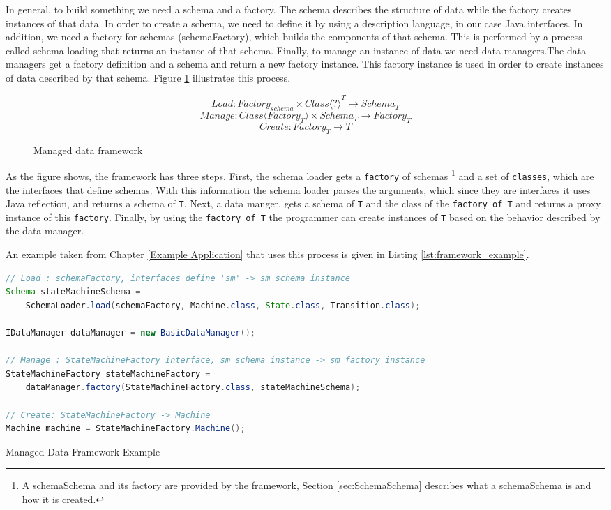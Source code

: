 In general, to build something we need a schema and a factory.
The schema describes the structure of data while the factory creates instances of that data.
In order to create a schema, we need to define it by using a description language, in our case Java interfaces.
In addition, we need a factory for schemas (schemaFactory), which builds the components of that schema.
This is performed by a process called schema loading that returns an instance of that schema.
Finally, to manage an instance of data we need data managers.The data managers get a factory definition and a schema and return a new factory instance.
This factory instance is used in order to create instances of data described by that schema.
Figure \ref{fig:formal_metamodel} illustrates this process.

\begin{figure}[H]
\centering
\[Load   : Factory_{schema} \times \overline{Class\langle ? \rangle}^{T} \rightarrow Schema_{T} \nonumber \]
\[Manage : Class\langle Factory_{T}\rangle \times Schema_{T} \rightarrow Factory_{T} \nonumber \]
\[Create : Factory_{T} \rightarrow T \nonumber\]

\caption{Managed data framework}
\label{fig:formal_metamodel}
\end{figure}

As the figure shows, the framework has three steps.
First, the schema loader gets a \texttt{factory} of schemas
\footnote{
	A schemaSchema and its factory are provided by the framework, Section \ref{sec:SchemaSchema} describes what a schemaSchema is and how it is created.} 
and a set of \texttt{classes}, which are the interfaces that define schemas.
With this information the schema loader parses the arguments, which since they are interfaces it uses Java reflection, and returns a schema of \texttt{T}.
Next, a data manger, gets a schema of \texttt{T} and the class of the \texttt{factory of T} and returns a proxy instance of this \texttt{factory}.
Finally, by using the \texttt{factory of T} the programmer can create instances of \texttt{T} based on the behavior described by the data manager.

An example taken from Chapter \ref{Example Application} that uses this process is given in Listing \ref{lst:framework_example}.

\begin{sourcecode}
	\begin{lstlisting}[language=Java, escapechar=|]
// Load : schemaFactory, interfaces define 'sm' -> sm schema instance
Schema stateMachineSchema =
	SchemaLoader.load(schemaFactory, Machine.class, State.class, Transition.class);

IDataManager dataManager = new BasicDataManager();

// Manage : StateMachineFactory interface, sm schema instance -> sm factory instance
StateMachineFactory stateMachineFactory = 
	dataManager.factory(StateMachineFactory.class, stateMachineSchema);

// Create: StateMachineFactory -> Machine
Machine machine = StateMachineFactory.Machine();
	\end{lstlisting}
	\caption{Managed Data Framework Example}
	\label{lst:framework_example}
\end{sourcecode}

